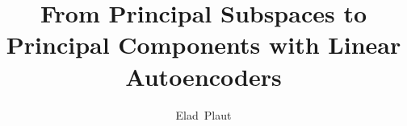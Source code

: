 \documentclass[journal]{IEEEtran}
\begin{document}
%
\title{From Principal Subspaces to Principal Components with Linear Autoencoders}
%
%
%

\author{Elad~Plaut%
}%
% 
%



% 
\end{document}
